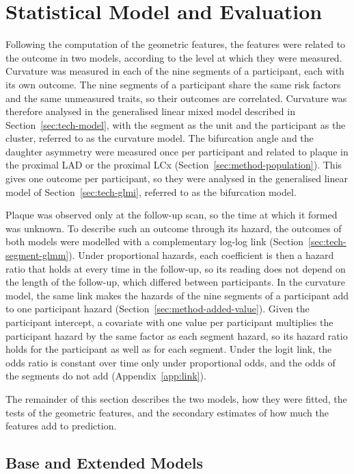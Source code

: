 \section{Statistical Model and Evaluation}
\label{sec:method-models}

Following the computation of the geometric features, the features were related to the outcome in two models, according to the level at which they were measured.
Curvature was measured in each of the nine segments of a participant, each with its own outcome.
The nine segments of a participant share the same risk factors and the same unmeasured traits, so their outcomes are correlated.
Curvature was therefore analysed in the generalised linear mixed model described in Section~\ref{sec:tech-model}, with the segment as the unit and the participant as the cluster, referred to as the curvature model.
The bifurcation angle and the daughter asymmetry were measured once per participant and related to plaque in the proximal LAD or the proximal LCx (Section~\ref{sec:method-population}).
This gives one outcome per participant, so they were analysed in the generalised linear model of Section~\ref{sec:tech-glmi}, referred to as the bifurcation model.

Plaque was observed only at the follow-up scan, so the time at which it formed was unknown.
To describe such an outcome through its hazard, the outcomes of both models were modelled with a complementary log-log link (Section~\ref{sec:tech-segment-glmm}).
Under proportional hazards, each coefficient is then a hazard ratio that holds at every time in the follow-up, so its reading does not depend on the length of the follow-up, which differed between participants.
In the curvature model, the same link makes the hazards of the nine segments of a participant add to one participant hazard (Section~\ref{sec:method-added-value}).
Given the participant intercept, a covariate with one value per participant multiplies the participant hazard by the same factor as each segment hazard, so its hazard ratio holds for the participant as well as for each segment.
Under the logit link, the odds ratio is constant over time only under proportional odds, and the odds of the segments do not add (Appendix~\ref{app:link}).

The remainder of this section describes the two models, how they were fitted, the tests of the geometric features, and the secondary estimates of how much the features add to prediction.

\subsection{Base and Extended Models}
\label{sec:method-model-spec}


